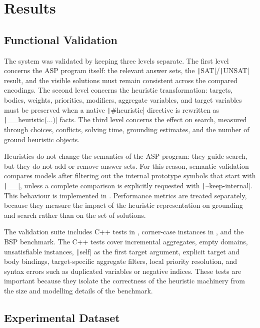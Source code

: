 \section{Results}

\subsection{Functional Validation}

The system was validated by keeping three levels separate. The first level concerns the ASP program itself: the relevant answer sets, the \texttt|SAT|/\texttt|UNSAT| result, and the visible solutions must remain consistent across the compared encodings. The second level concerns the heuristic transformation: targets, bodies, weights, priorities, modifiers, aggregate variables, and target variables must be preserved when a native \texttt|#heuristic| directive is rewritten as \texttt|__heuristic(...)| facts. The third level concerns the effect on search, measured through choices, conflicts, solving time, grounding estimates, and the number of ground heuristic objects.

Heuristics do not change the semantics of the ASP program: they guide search, but they do not add or remove answer sets. For this reason, semantic validation compares models after filtering out the internal prototype symbols that start with \texttt|__|, unless a complete comparison is explicitly requested with \texttt|--keep-internal|. This behaviour is implemented in . Performance metrics are treated separately, because they measure the impact of the heuristic representation on grounding and search rather than on the set of solutions.

The validation suite includes C++ tests in , corner-case instances in , and the BSP benchmark. The C++ tests cover incremental aggregates, empty domains, unsatisfiable instances, \texttt|self| as the first target argument, explicit target and body bindings, target-specific aggregate filters, local priority resolution, and syntax errors such as duplicated variables or negative indices. These tests are important because they isolate the correctness of the heuristic machinery from the size and modelling details of the benchmark.

\subsection{Experimental Dataset}

